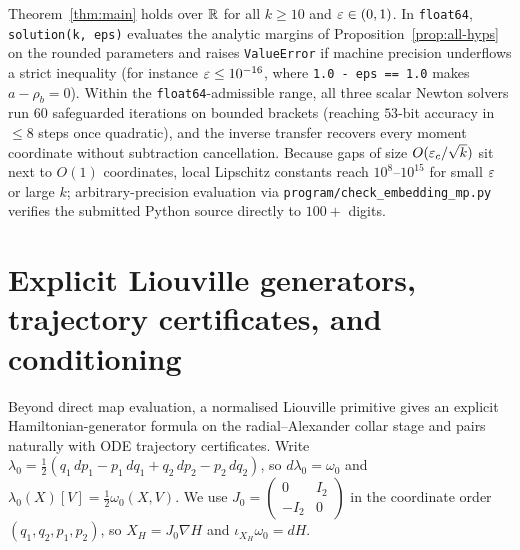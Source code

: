 \begin{remark}\label{rem:float64}
Theorem~\ref{thm:main} holds over $\mathbb{R}$ for all $k\ge10$ and $\varepsilon\in(0,1)$. In \texttt{float64}, \texttt{solution(k, eps)}
evaluates the analytic margins of Proposition~\ref{prop:all-hyps} on the rounded parameters and raises \texttt{ValueError}
if machine precision underflows a strict inequality (for instance $\varepsilon\le10^{-16}$, where \texttt{1.0 - eps == 1.0}
makes $a-\rho_b=0$). Within the \texttt{float64}-admissible range, all three scalar Newton solvers run $60$ safeguarded
iterations on bounded brackets (reaching $53$-bit accuracy in $\le8$ steps once quadratic), and the inverse transfer
recovers every moment coordinate without subtraction cancellation. Because gaps of size $O(\varepsilon_c/\sqrt k)$ sit next to
$O(1)$ coordinates, local Lipschitz constants reach $10^8$--$10^{15}$ for small $\varepsilon$ or large $k$; arbitrary-precision
evaluation via \texttt{program/check\_embedding\_mp.py} verifies the submitted Python source directly to $100+$ digits.
\end{remark}

\section{Explicit Liouville generators, trajectory certificates, and conditioning}\label{sec:hamiltonian}

Beyond direct map evaluation, a normalised Liouville primitive gives an explicit Hamiltonian-generator formula on
the radial--Alexander collar stage and pairs naturally with ODE trajectory certificates. Write
$\lambda_0=\frac12(q_1\,dp_1-p_1\,dq_1+q_2\,dp_2-p_2\,dq_2)$, so $d\lambda_0=\omega_0$ and
$\lambda_0(X)[V]=\frac12\omega_0(X,V)$.
We use $J_0=\left(\begin{smallmatrix}0&I_2\\-I_2&0\end{smallmatrix}\right)$ in the coordinate order $(q_1,q_2,p_1,p_2)$,
so $X_H=J_0\nabla H$ and $\iota_{X_H}\omega_0=dH$.

